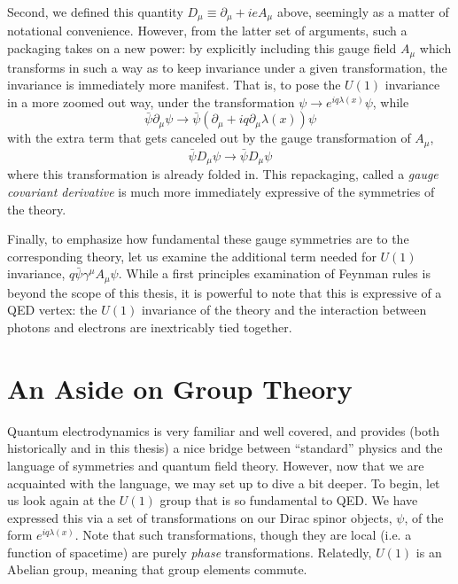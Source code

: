 Second, we defined this quantity $D_{\mu} \equiv \partial_{\mu} + ieA_{\mu}$ above, seemingly as a matter 
of notational convenience. However, from the latter set of arguments, such a packaging takes on a new power: 
by explicitly including this gauge field $A_{\mu}$ which transforms in such a way as to keep invariance 
under a given transformation, the invariance is immediately more manifest. That is, to pose the $U(1)$ 
invariance in a more zoomed out way, under the transformation $\psi\rightarrow e^{iq\lambda(x)}\psi$,
while
\begin{equation}
\bar{\psi}\partial_{\mu}\psi \rightarrow \bar{\psi}(\partial_{\mu}+iq\partial_{\mu}\lambda(x))\psi
\end{equation}
with the extra term that gets canceled out by the gauge transformation of $A_{\mu}$,
\begin{equation}
\bar{\psi}D_{\mu}\psi \rightarrow \bar{\psi}D_{\mu}\psi
\end{equation}
where this transformation is already folded in. This repackaging, called a \emph{gauge covariant derivative} 
is much more immediately expressive of the symmetries of the theory.

Finally, to emphasize how fundamental these gauge symmetries are to the corresponding theory, let us examine
the additional term needed for $U(1)$ invariance, $q\bar{\psi}\gamma^{\mu}A_{\mu}\psi$. While a first principles
examination of Feynman rules is beyond the scope of this thesis, it is powerful to note that this is expressive 
of a QED vertex: the $U(1)$ invariance of the theory and the interaction between photons and electrons are 
inextricably tied together.

\section{An Aside on Group Theory}
Quantum electrodynamics is very familiar and well covered, and provides (both historically and in this thesis) 
a nice bridge between ``standard'' physics and the language of symmetries and quantum field theory. However, now 
that we are acquainted with the language, we may set up to dive a bit deeper. To begin, let us look again at the $U(1)$ 
group that is so fundamental to QED. We have expressed this via a set of transformations on our Dirac spinor objects, 
$\psi$, of the form $e^{iq\lambda(x)}$. Note that such transformations, though they are local (i.e. a function of 
spacetime) are purely \emph{phase} transformations. Relatedly, $U(1)$ is an Abelian group, meaning that 
group elements commute.

